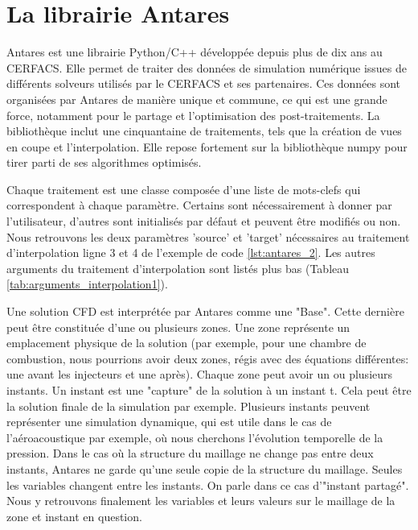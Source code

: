 \section{La librairie Antares}

Antares est une librairie Python/C++ développée depuis plus de dix ans au CERFACS. Elle permet de traiter des données de simulation numérique issues de différents solveurs utilisés par le CERFACS et ses partenaires. Ces données sont organisées par Antares de manière unique et commune, ce qui est une grande force, notamment pour le partage et l'optimisation des post-traitements.
La bibliothèque inclut une cinquantaine de traitements, tels que la création de vues en coupe et l'interpolation.
Elle repose fortement sur la bibliothèque numpy pour tirer parti de ses algorithmes optimisés. %




Chaque traitement est une classe composée d'une liste de mots-clefs qui correspondent à chaque paramètre. Certains sont nécessairement à donner par l'utilisateur, d'autres sont initialisés par défaut et peuvent être modifiés ou non. Nous retrouvons les deux paramètres 'source' et 'target' nécessaires au traitement d'interpolation ligne 3 et 4 de l'exemple de code \ref{lst:antares_2}. Les autres arguments du traitement d'interpolation sont listés plus bas (Tableau \ref{tab:arguments_interpolation1}).


Une solution CFD est interprétée par Antares comme une "Base".
Cette dernière peut être constituée d'une ou plusieurs zones.
Une zone représente un emplacement physique de la solution (par exemple, pour une chambre de combustion, nous pourrions avoir deux zones, régis avec des équations différentes: une avant les injecteurs et une après). %
Chaque zone peut avoir un ou plusieurs instants.
Un instant est une "capture" de la solution à un instant t. Cela peut être la solution finale de la simulation par exemple. Plusieurs instants peuvent représenter une simulation dynamique, qui est utile dans le cas de l'aéroacoustique par exemple, où nous cherchons l'évolution temporelle de la pression.
Dans le cas où la structure du maillage ne change pas entre deux instants, Antares ne garde qu'une seule copie de la structure du maillage. Seules les variables changent entre les instants. On parle dans ce cas d'"instant partagé".\label{instants_partages}
Nous y retrouvons finalement les variables et leurs valeurs sur le maillage de la zone et instant en question.

